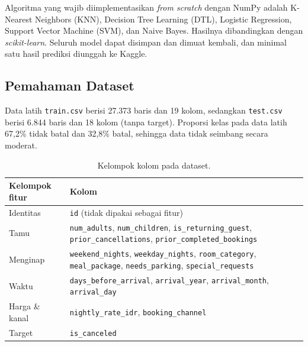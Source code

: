 \documentclass[12pt,a4paper]{article}
\begin{document}
Algoritma yang wajib diimplementasikan \textit{from scratch} dengan NumPy adalah K-Nearest Neighbors (KNN), Decision Tree Learning (DTL), Logistic Regression, Support Vector Machine (SVM), dan Naive Bayes. Hasilnya dibandingkan dengan \textit{scikit-learn}. Seluruh model dapat disimpan dan dimuat kembali, dan minimal satu hasil prediksi diunggah ke Kaggle.

\subsection{Pemahaman Dataset}
Data latih \texttt{train.csv} berisi 27.373 baris dan 19 kolom, sedangkan \texttt{test.csv} berisi 6.844 baris dan 18 kolom (tanpa target). Proporsi kelas pada data latih 67,2\% tidak batal dan 32,8\% batal, sehingga data tidak seimbang secara moderat.

\begin{table}[H]\centering\small
\begin{tabularx}{\textwidth}{lX}
\toprule
Kelompok fitur & Kolom \\
\midrule
Identitas & \texttt{id} (tidak dipakai sebagai fitur) \\
Tamu & \texttt{num\_adults}, \texttt{num\_children}, \texttt{is\_returning\_guest}, \texttt{prior\_cancellations}, \texttt{prior\_completed\_bookings} \\
Menginap & \texttt{weekend\_nights}, \texttt{weekday\_nights}, \texttt{room\_category}, \texttt{meal\_package}, \texttt{needs\_parking}, \texttt{special\_requests} \\
Waktu & \texttt{days\_before\_arrival}, \texttt{arrival\_year}, \texttt{arrival\_month}, \texttt{arrival\_day} \\
Harga \& kanal & \texttt{nightly\_rate\_idr}, \texttt{booking\_channel} \\
Target & \texttt{is\_canceled} \\
\bottomrule
\end{tabularx}
\caption{Kelompok kolom pada dataset.}
\end{table}
\end{document}
